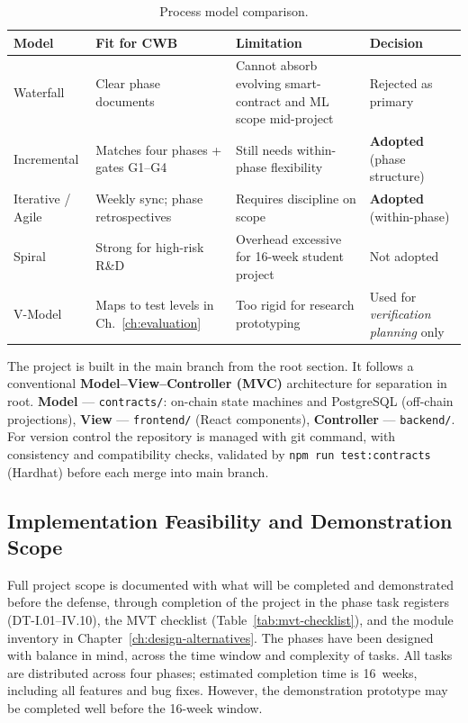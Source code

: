 \documentclass[12pt,a4paper]{report}
\newcommand{\tableheadcolor}{\rowcolor{TableHeadBg}}
\begin{document}
\begin{table}[H]
\centering
\caption[Process model comparison]{Process model comparison.}
\label{tab:process-model-comparison}
\small
\begin{tabular}{@{}p{2.4cm}p{3.2cm}p{3.2cm}p{5.4cm}@{}}
\toprule
\tableheadcolor
\textbf{Model} & \textbf{Fit for CWB} & \textbf{Limitation} & \textbf{Decision} \\
\midrule
Waterfall & Clear phase documents & Cannot absorb evolving smart-contract and ML scope mid-project & Rejected as primary \\
Incremental & Matches four phases + gates G1--G4 & Still needs within-phase flexibility & \textbf{Adopted} (phase structure) \\
Iterative / Agile & Weekly sync; phase retrospectives & Requires discipline on scope & \textbf{Adopted} (within-phase) \\
Spiral & Strong for high-risk R\&D & Overhead excessive for 16-week student project & Not adopted \\
V-Model & Maps to test levels in Ch.~\ref{ch:evaluation} & Too rigid for research prototyping & Used for \textit{verification planning} only \\
\bottomrule
\end{tabular}
\end{table}

The project is built in the main branch from the root section. It follows a conventional \textbf{Model--View--Controller (MVC)} architecture for separation in root. \textbf{Model} --- \texttt{contracts/}: on-chain state machines and PostgreSQL (off-chain projections), \textbf{View} --- \texttt{frontend/} (React components), \textbf{Controller} --- \texttt{backend/}. For version control the repository is managed with git command, with consistency and compatibility checks, validated by \texttt{npm run test:contracts} (Hardhat) before each merge into main branch.

\subsection{Implementation Feasibility and Demonstration Scope}
\label{sec:impl-feasibility}

Full project scope is documented with what will be completed and demonstrated before the defense, through completion of the project in the phase task registers (DT-I.01--IV.10), the MVT checklist (Table~\ref{tab:mvt-checklist}), and the module inventory in Chapter~\ref{ch:design-alternatives}. The phases have been designed with balance in mind, across the time window and complexity of tasks. All tasks are distributed across four phases; estimated completion time is 16~weeks, including all features and bug fixes. However, the demonstration prototype may be completed well before the 16-week window.
\end{document}
